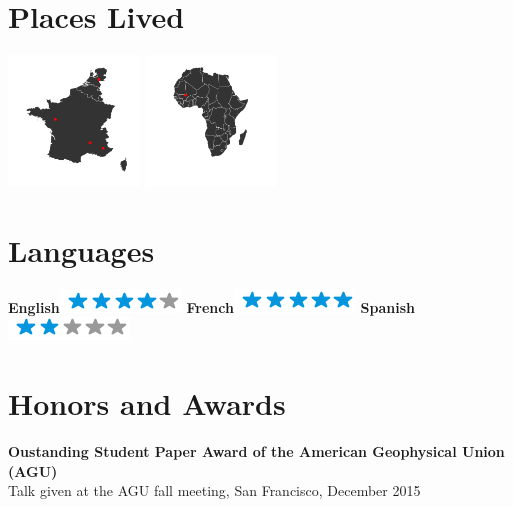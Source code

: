 \documentclass[]{friggeri-cv}
\begin{document}
\begin{aside}
~
~
~
  \section{Places Lived}
    \includegraphics[width=3.5cm]{img/map.png}
    \includegraphics[width=3.5cm]{img/mapAfrica.png}
    ~
  \section{Languages}
    \textbf{English}\includegraphics[scale=0.40]{img/4stars.png}
    \textbf{French}\includegraphics[scale=0.40]{img/5stars.png}
    \textbf{Spanish}\includegraphics[scale=0.40]{img/2stars.png}
\end{aside}

\section{Honors and Awards}
	\textbf{Oustanding Student Paper Award of the American Geophysical Union (AGU)}\\
	Talk given at the AGU fall meeting, San Francisco, December 2015
\end{document}
